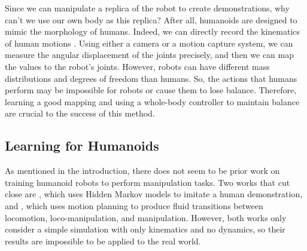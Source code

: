 Since we can manipulate a replica of the robot to create demonstrations, why can't we use our own body as this replica? After all, humanoids are designed to mimic the morphology of humans. 
Indeed, we can directly record the kinematics of human motions \cite{Billard:2013}. Using either a camera or a motion capture system, we can measure the angular displacement of the joints precisely, and then we can map the values to the robot's joints. However, robots can have different mass distributions and degrees of freedom than humans. So, the actions that humans perform may be impossible for robots or cause them to lose balance. Therefore, learning a good mapping and using a whole-body controller to maintain balance are crucial to the success of this method.

\subsection{Learning for Humanoids}
As mentioned in the introduction, there does not seem to be prior work on training humanoid robots to perform manipulation tasks. 
Two works that cut close are \cite{4115578}, which uses Hidden Markov models to imitate a human demonstration, and \cite{7989550}, which uses motion planning to produce fluid transitions between locomotion, loco-manipulation, and manipulation. However, both works only consider a simple simulation with only kinematics and no dynamics, so their results are impossible to be applied to the real world.

